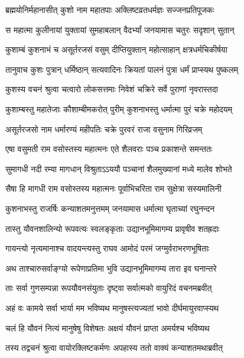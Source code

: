 
\twolineshloka
{ब्रह्मयोनिर्महानासीत् कुशो नाम महातपाः}
{अक्लिष्टव्रतधर्मज्ञः सज्जनप्रतिपूजकः} %

\twolineshloka
{स महात्मा कुलीनायां युक्तायां सुमहाबलान्}
{वैदर्भ्यां जनयामास चतुरः सदृशान् सुतान्} %

\twolineshloka
{कुशाम्बं कुशनाभं च असूर्तरजसं वसुम्}
{दीप्तियुक्तान् महोत्साहान् क्षत्रधर्मचिकीर्षया} %

\twolineshloka
{तानुवाच कुशः पुत्रान् धर्मिष्ठान् सत्यवादिनः}
{क्रियतां पालनं पुत्रा धर्मं प्राप्स्यथ पुष्कलम्} %

\twolineshloka
{कुशस्य वचनं श्रुत्वा चत्वारो लोकसत्तमाः}
{निवेशं चक्रिरे सर्वे पुराणां नृवरास्तदा} %

\twolineshloka
{कुशाम्बस्तु महातेजाः कौशाम्बीमकरोत् पुरीम्}
{कुशनाभस्तु धर्मात्मा पुरं चक्रे महोदयम्} %

\twolineshloka
{असूर्तरजसो नाम धर्मारण्यं महीपतिः}
{चक्रे पुरवरं राजा वसुनाम गिरिव्रजम्} %

\twolineshloka
{एषा वसुमती राम वसोस्तस्य महात्मनः}
{एते शैलवराः पञ्च प्रकाशन्ते समन्ततः} %

\twolineshloka
{सुमागधी नदी रम्या मागधान् विश्रुताऽऽययौ}
{पञ्चानां शैलमुख्यानां मध्ये मालेव शोभते} %

\twolineshloka
{सैषा हि मागधी राम वसोस्तस्य महात्मनः}
{पूर्वाभिचरिता राम सुक्षेत्रा सस्यमालिनी} %

\twolineshloka
{कुशनाभस्तु राजर्षिः कन्याशतमनुत्तमम्}
{जनयामास धर्मात्मा घृताच्यां रघुनन्दन} %

\twolineshloka
{तास्तु यौवनशालिन्यो रूपवत्यः स्वलङ्कृताः}
{उद्यानभूमिमागम्य प्रावृषीव शतह्रदाः} %

\twolineshloka
{गायन्त्यो नृत्यमानाश्च वादयन्त्यस्तु राघव}
{आमोदं परमं जग्मुर्वराभरणभूषिताः} %

\twolineshloka
{अथ ताश्चारुसर्वाङ्ग्यो रूपेणाप्रतिमा भुवि}
{उद्यानभूमिमागम्य तारा इव घनान्तरे} %

\twolineshloka
{ताः सर्वा गुणसम्पन्ना रूपयौवनसंयुताः}
{दृष्ट्वा सर्वात्मको वायुरिदं वचनमब्रवीत्} %

\twolineshloka
{अहं वः कामये सर्वा भार्या मम भविष्यथ}
{मानुषस्त्यज्यतां भावो दीर्घमायुरवाप्स्यथ} %

\twolineshloka
{चलं हि यौवनं नित्यं मानुषेषु विशेषतः}
{अक्षयं यौवनं प्राप्ता अमर्यश्च भविष्यथ} %

\twolineshloka
{तस्य तद्वचनं श्रुत्वा वायोरक्लिष्टकर्मणः}
{अपहास्य ततो वाक्यं कन्याशतमथाब्रवीत्} %

